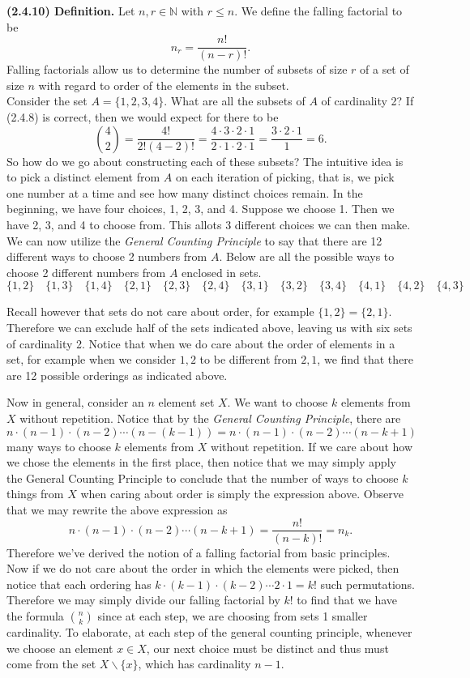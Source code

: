 \documentclass[12pt]{book}
\def\N{{\mathbb{N}}}
\def\header #1{\noindent\textbf{#1}}
\begin{document}

\header{(2.4.10) Definition.} Let $n,r\in\N$ with $r\leq n$. We define the falling factorial to be
\[n_r=\frac{n!}{(n-r)!}.\]
Falling factorials allow us to determine the number of subsets of size $r$ of a set of size $n$ with regard to order of the elements in the subset.\\

Consider the set $A=\{1,2,3,4\}$. What are all the subsets of $A$ of cardinality 2? If (2.4.8) is correct, then we would expect for there to be 
\[\binom{4}{2}=\frac{4!}{2!(4-2)!}=\frac{4\cdot 3\cdot 2\cdot 1}{2\cdot 1\cdot 2\cdot 1}=\frac{3\cdot 2\cdot 1}{1}=6.\]
So how do we go about constructing each of these subsets? The intuitive idea is to pick a distinct element from $A$ on each iteration of picking, that is, we pick one number at a time and see how many distinct choices remain. In the beginning, we have four choices, 1, 2, 3, and 4. Suppose we choose 1. Then we have 2, 3, and 4 to choose from. This allots 3 different choices we can then make. We can now utilize the \textit{General Counting Principle} to say that there are 12 different ways to choose 2 numbers from $A$. Below are all the possible ways to choose 2 different numbers from  $A$ enclosed in sets.
\[\{1,2\}\quad\{1,3\}\quad\{1,4\}\quad\{2,1\}\quad\{2,3\}\quad\{2,4\}\quad\{3,1\}\quad\{3,2\}\quad\{3,4\}\quad\{4,1\}\quad\{4,2\}\quad\{4,3\}\] 

Recall however that sets do not care about order, for example $\{1,2\}=\{2,1\}$. Therefore we can exclude half of the sets indicated above, leaving us with six sets of cardinality 2. Notice that when we do care about the order of elements in a set, for example when we consider $1,2$ to be different from $2,1$, we find that there are 12 possible orderings as indicated above. 

Now in general, consider an $n$ element set $X$. We want to choose $k$ elements from  $X$ without repetition. Notice that by the \textit{General Counting Principle}, there are
\[n\cdot(n-1)\cdot(n-2)\cdots (n-(k-1))=n\cdot (n-1)\cdot(n-2)\cdots(n-k+1)\]
many ways to choose $k$ elements from $X$ without repetition. If we care about how we chose the elements in the first place, then notice that we may simply apply the General Counting Principle to conclude that the number of ways to choose $k$ things from $X$ when caring about order is simply the expression above. Observe that we may rewrite the above expression as
\[n\cdot (n-1)\cdot(n-2)\cdots(n-k+1)=\frac{n!}{(n-k)!}=n_k.\]
Therefore we've derived the notion of a falling factorial from basic principles. Now if we do not care about the order in which the elements were picked, then notice that each ordering has $k\cdot (k-1)\cdot (k-2)\cdots 2\cdot 1=k!$ such permutations. Therefore we may simply divide our falling factorial by $k!$ to find that we have the formula $\binom{n}{k}$ since at each step, we are choosing from sets 1 smaller cardinality. To elaborate, at each step of the general counting principle, whenever we choose an element $x\in X$, our next choice must be distinct and thus must come from the set $X\backslash\{x\}$, which has cardinality $n-1$.
\end{document}
